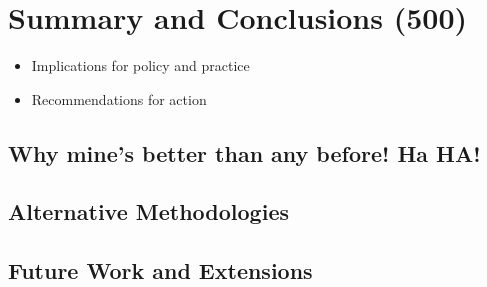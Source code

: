 \chapter{Summary and Conclusions (500)}
\begin{itemize}
	\item Implications for policy and practice
	\item Recommendations for action
\end{itemize}
\section{Why mine's better than any before! Ha HA!}
\section{Alternative Methodologies}
\section{Future Work and Extensions}

